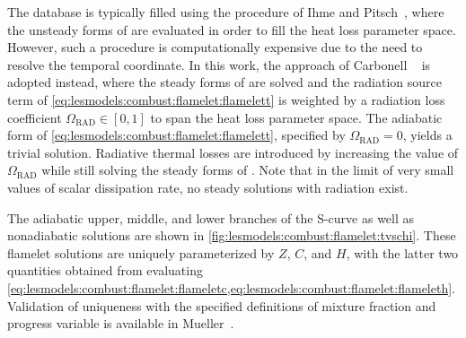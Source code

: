 The database is typically filled using the procedure of Ihme and Pitsch~\cite{ihme2008}, where the unsteady forms of  are evaluated in order to fill the heat loss parameter space. However, such a procedure is computationally expensive due to the need to resolve the temporal coordinate. In this work, the approach of Carbonell \etal~\cite{carbonell2009} is adopted instead, where the steady forms of  are solved and the radiation source term of \cref{eq:lesmodels:combust:flamelet:flamelett} is weighted by a radiation loss coefficient $\Omega_{\text{RAD}} \in [0,1]$ to span the heat loss parameter space. The adiabatic form of \cref{eq:lesmodels:combust:flamelet:flamelett}, specified by $\Omega_{\text{RAD}} = 0$, yields a trivial solution. Radiative thermal losses are introduced by increasing the value of $\Omega_{\text{RAD}}$ while still solving the steady forms of . Note that in the limit of very small values of scalar dissipation rate, no steady solutions with radiation exist.

The adiabatic upper, middle, and lower branches of the S-curve as well as nonadiabatic solutions are shown in \cref{fig:lesmodels:combust:flamelet:tvschi}. These flamelet solutions are uniquely parameterized by $Z$, $C$, and $H$, with the latter two quantities obtained from evaluating \cref{eq:lesmodels:combust:flamelet:flameletc,eq:lesmodels:combust:flamelet:flameleth}. Validation of uniqueness with the specified definitions of mixture fraction and progress variable is available in Mueller~\cite{muellerphd}.


